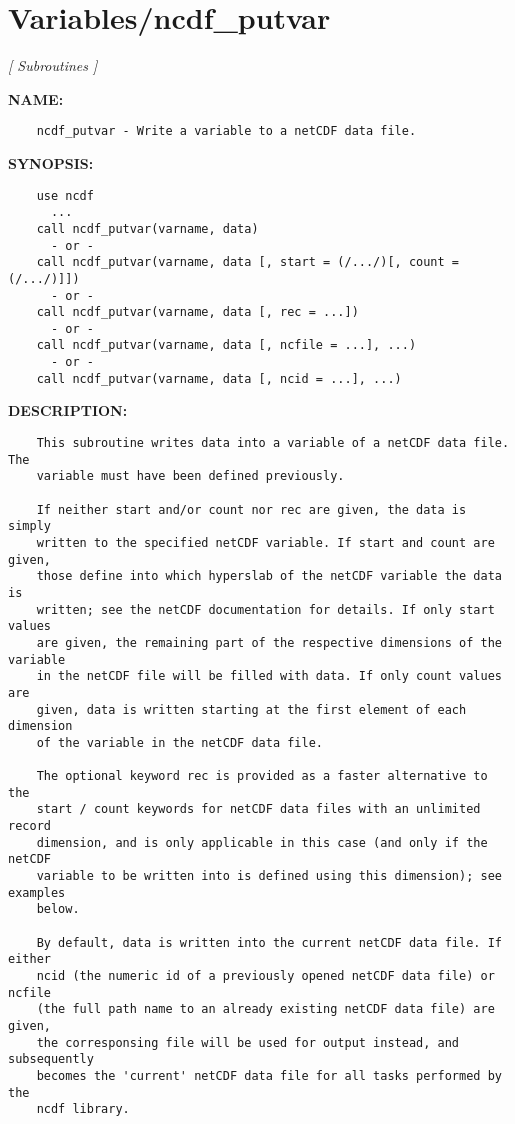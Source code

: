 \section{Variables/ncdf\_putvar}
\textsl{[ Subroutines ]}

\label{ch:robo117}
\label{ch:Variables_ncdf_putvar}
\textbf{NAME:}\hspace{0.08in}\begin{Verbatim}
    ncdf_putvar - Write a variable to a netCDF data file.
\end{Verbatim}
\textbf{SYNOPSIS:}\hspace{0.08in}\begin{Verbatim}
    use ncdf
      ...
    call ncdf_putvar(varname, data)
      - or -
    call ncdf_putvar(varname, data [, start = (/.../)[, count = (/.../)]])
      - or -
    call ncdf_putvar(varname, data [, rec = ...])
      - or -
    call ncdf_putvar(varname, data [, ncfile = ...], ...)
      - or -
    call ncdf_putvar(varname, data [, ncid = ...], ...)
\end{Verbatim}
\textbf{DESCRIPTION:}\hspace{0.08in}\begin{Verbatim}
    This subroutine writes data into a variable of a netCDF data file. The
    variable must have been defined previously.

    If neither start and/or count nor rec are given, the data is simply
    written to the specified netCDF variable. If start and count are given,
    those define into which hyperslab of the netCDF variable the data is
    written; see the netCDF documentation for details. If only start values
    are given, the remaining part of the respective dimensions of the variable
    in the netCDF file will be filled with data. If only count values are
    given, data is written starting at the first element of each dimension
    of the variable in the netCDF data file.

    The optional keyword rec is provided as a faster alternative to the
    start / count keywords for netCDF data files with an unlimited record
    dimension, and is only applicable in this case (and only if the netCDF
    variable to be written into is defined using this dimension); see examples
    below. 

    By default, data is written into the current netCDF data file. If either
    ncid (the numeric id of a previously opened netCDF data file) or ncfile
    (the full path name to an already existing netCDF data file) are given,
    the corresponsing file will be used for output instead, and subsequently
    becomes the 'current' netCDF data file for all tasks performed by the
    ncdf library.
\end{Verbatim}
